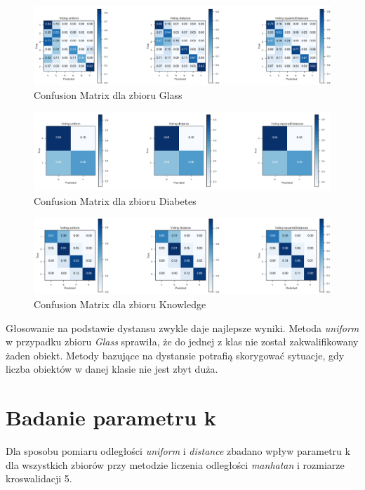 \documentclass[12pt,a4paper]{article}
\begin{document}
\begin{figure}[H]
\centering
\includegraphics[width=1\textwidth]{VotingGlass.PNG}
\caption{Confusion Matrix dla zbioru Glass}
\end{figure}

\begin{figure}[H]
\centering
\includegraphics[width=1\textwidth]{VotingDiabetes.PNG}
\caption{Confusion Matrix dla zbioru Diabetes}
\end{figure}

\begin{figure}[H]
\centering
\includegraphics[width=1\textwidth]{VotingKnowledge.PNG}
\caption{Confusion Matrix dla zbioru Knowledge}
\end{figure}

Głosowanie na podstawie dystansu zwykle daje najlepsze wyniki. Metoda \textit{uniform} w przypadku zbioru \textit{Glass} sprawiła, że do jednej z klas nie został zakwalifikowany żaden obiekt. Metody bazujące na dystansie potrafią skorygować sytuacje, gdy liczba obiektów w danej klasie nie jest zbyt duża.

\section{Badanie parametru k}
Dla sposobu pomiaru odległości \textit{uniform} i \textit{distance} zbadano wpływ parametru k dla wszystkich zbiorów przy metodzie liczenia odległości \textit{manhatan} i rozmiarze kroswalidacji 5.
\end{document}
